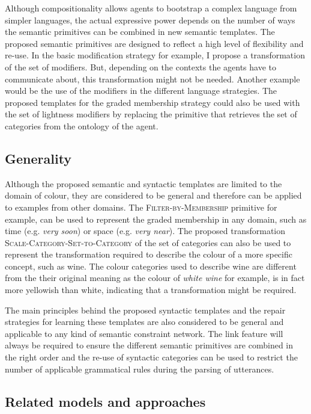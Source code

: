 Although compositionality allows agents to bootstrap a complex
language from simpler languages, the actual expressive power depends
on the number of ways the semantic primitives can be combined in new semantic templates.
The proposed semantic primitives
are designed to reflect a high level of flexibility and re-use. In the
basic modification strategy for example, I propose a
transformation of the set of modifiers. But, depending on the contexts
the agents have to communicate about, this transformation
might not be needed. Another example would be the use of the modifiers
in the different language strategies. The proposed templates for the
graded membership strategy could also be used with the set of
lightness modifiers by replacing the primitive that retrieves the set
of categories from the ontology of the agent.

\subsection{Generality}

Although the proposed semantic and syntactic templates are limited to
the domain of colour, they are considered to be general and therefore can be
applied to examples from other domains. The
\textsc{Filter-by-Membership} primitive for example, can be used to
represent the graded membership in any domain, such as time
(e.g. \textit{very soon}) or space (e.g. \textit{very near}). The proposed
transformation \textsc{Scale-Category-Set-to-Category} of the set of
categories can also be used to represent the transformation required
to describe the colour of a more specific concept, such as wine. The colour
categories used to describe wine are different from the their original
meaning as the colour of \textit{white wine} for example, is in fact more
yellowish than white, indicating that a transformation might be required.

The main principles behind the proposed syntactic templates and the repair
strategies for learning these templates are also considered to be
general and applicable to any kind of semantic constraint
network. The link feature will always be required to ensure the
different semantic primitives are combined in the right order and the
re-use of syntactic categories can be used to restrict the number of applicable
grammatical rules during the parsing of utterances.

\subsection{Related models and approaches}

